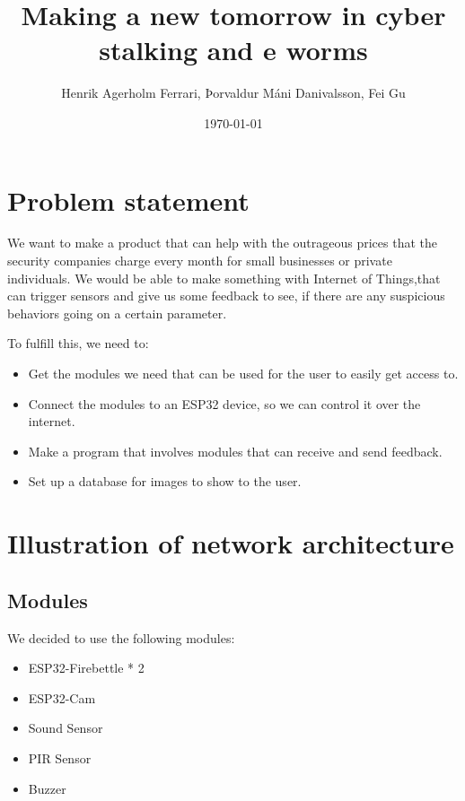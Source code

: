 \documentclass[12pt]{article}        %
\title{Making a new tomorrow in cyber stalking and e worms}                                   %
\author{Henrik Agerholm Ferrari, Þorvaldur Máni Danivalsson, Fei Gu}
\date{\today}
\begin{document}

    \maketitle
    \tableofcontents

    \pagebreak
    \section{Problem statement}\label{sec:problem-statement}
    We want to make a product that can help with the outrageous prices that the security companies charge every
    month for small businesses or private individuals.
    We would be able to make something with Internet of Things,that can trigger sensors and give us some feedback
    to see, if there are any suspicious behaviors going on a certain parameter.

    To fulfill this, we need to:
    \begin{itemize}

        \item Get the modules we need that can be used for the user to easily get access to.

        \item Connect the modules to an ESP32 device, so we can control it over the internet.

        \item Make a program that involves modules that can receive and send feedback.

        \item Set up a database for images to show to the user.

    \end{itemize}

    \section{Illustration of network architecture}\label{sec:illustration-of-network-architecture}
    \subsection{Modules}\label{subsec:modules}

    We decided to use the following modules:

    \begin{itemize}
        \item ESP32-Firebettle * 2
        \item ESP32-Cam
        \item Sound Sensor
        \item PIR Sensor
        \item Buzzer
    \end{itemize}
\end{document}
